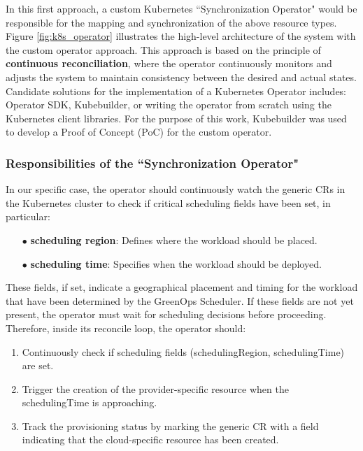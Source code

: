 In this first approach, a custom Kubernetes ``Synchronization Operator" would be responsible for the mapping and synchronization of the above resource types. 
Figure \ref{fig:k8s_operator} illustrates the high-level architecture of the system with the custom operator approach.
This approach is based on the principle of \textbf{continuous reconciliation}, where the operator continuously monitors and adjusts the system to maintain consistency between the desired and actual states.
Candidate solutions for the implementation of a Kubernetes Operator includes: Operator SDK, Kubebuilder, or writing the operator from scratch using the Kubernetes client libraries. 
For the purpose of this work, Kubebuilder was used to develop a Proof of Concept (PoC) for the custom operator.

\subsubsection{Responsibilities of the ``Synchronization Operator"}

In our specific case, the operator should continuously watch the generic CRs in the Kubernetes cluster to check if critical scheduling fields have been set, in particular:
\begin{itemize}[itemsep=0.2pt, topsep=1pt]
  \item[$\bullet$] \textbf{scheduling region}: Defines where the workload should be placed.
  \item[$\bullet$] \textbf{scheduling time}: Specifies when the workload should be deployed.
\end{itemize}

These fields, if set, indicate a geographical placement and timing for the workload that have been determined by the GreenOps Scheduler.
If these fields are not yet present, the operator must wait for scheduling decisions before proceeding.
Therefore, inside its reconcile loop, the operator should:
\begin{enumerate}[itemsep=0.2pt, topsep=1pt]
  \item Continuously check if scheduling fields (schedulingRegion, schedulingTime) are set.
  \item Trigger the creation of the provider-specific resource when the schedulingTime is approaching.
  \item Track the provisioning status by marking the generic CR with a field indicating that the cloud-specific resource has been created.
\end{enumerate}

